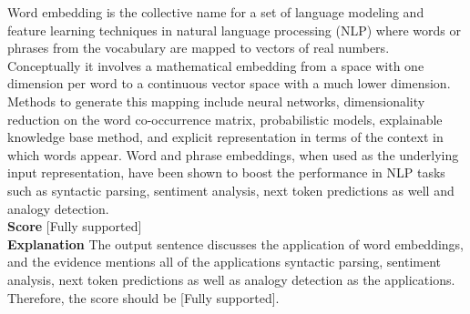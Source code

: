\begin{table}[h!]
\begin{tcolorbox}
Word embedding is the collective name for a set of language modeling and feature learning techniques in natural language processing (NLP) where words or phrases from the vocabulary are mapped to vectors of real numbers. Conceptually it involves a mathematical embedding from a space with one dimension per word to a continuous vector space with a much lower dimension. Methods to generate this mapping include neural networks, dimensionality reduction on the word co-occurrence matrix, probabilistic models, explainable knowledge base method, and explicit representation in terms of the context in which words appear. Word and phrase embeddings, when used as the underlying input representation, have been shown to boost the performance in NLP tasks such as syntactic parsing, sentiment analysis, next token predictions as well and analogy detection. \\
{\bf Score} [Fully supported] \\
{\bf Explanation} The output sentence discusses the application of word embeddings, and the evidence mentions all of the applications syntactic parsing, sentiment analysis, next token predictions as well as analogy detection as the applications. Therefore, the score should be [Fully supported].
\end{tcolorbox}
\caption{\label{tab:algo_box_grd} Instructions and demonstrations for \cgr tokens. }
\end{table}

